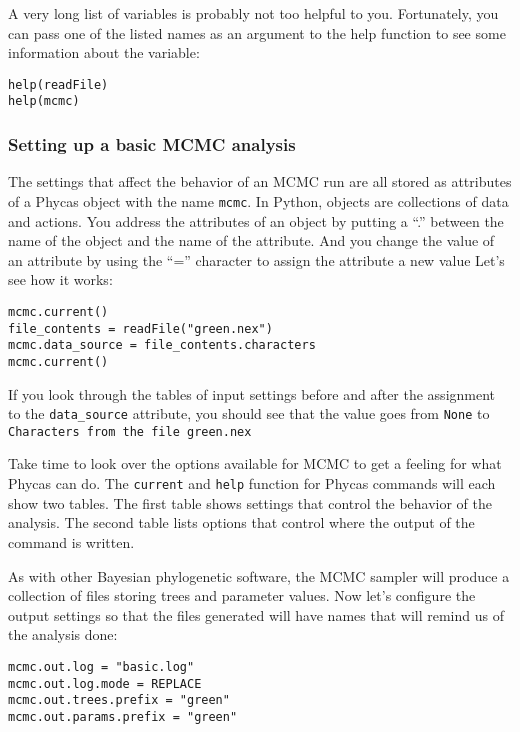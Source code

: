 \documentclass{article}
\newcommand{\cmdopt}[1]{\texttt{#1}\xspace}
\newcommand{\cmd}[1]{\texttt{#1}\xspace}
\newcommand{\phycas}{Phycas\xspace}
\begin{document}
A very long list of variables is probably not too helpful to you.
Fortunately, you can pass one of the listed names as an argument
to the help function to see some information about the variable:
\begin{verbatim}
help(readFile)
help(mcmc)
\end{verbatim}

\subsubsection{Setting up a basic MCMC analysis}
The settings that affect the behavior of an MCMC run are all stored
as attributes of a \phycas object with the name \cmd{mcmc}.
In Python, objects are collections of data and actions.
You address the attributes of an object by putting a ``.'' between
the name of the object and the name of the attribute.
And you change the value of an attribute by using the ``='' character
to assign the attribute a new value
Let's see how it works:
\begin{verbatim}
mcmc.current()
file_contents = readFile("green.nex")
mcmc.data_source = file_contents.characters
mcmc.current()
\end{verbatim}
If you look through the tables of input settings before and after
the assignment to the \cmdopt{data\_source} attribute, you should see
that the value goes from \cmd{None} to \cmd{Characters from the file green.nex}

Take time to look over the options available for MCMC to get a feeling for
what \phycas can do.
The \cmd{current} and \cmd{help} function for \phycas commands will 
each show two tables.
The first table shows settings that control the behavior
of the analysis.
The second table lists options that control
where the output of the command is written.

As with other Bayesian phylogenetic software, the MCMC sampler will produce a collection of files storing
trees and parameter values.
Now let's configure the output settings so that the files generated will have names that 
will remind us of the analysis done:
\begin{verbatim}
mcmc.out.log = "basic.log"
mcmc.out.log.mode = REPLACE
mcmc.out.trees.prefix = "green"
mcmc.out.params.prefix = "green"
\end{verbatim}
\end{document}
